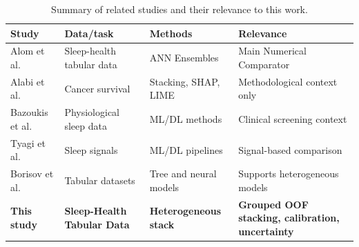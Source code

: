 \documentclass[a4paper,fleqn]{cas-dc}
\begin{document}
\begin{table}[width=\textwidth,pos=!tbp]

\centering

\caption{Summary of related studies and their relevance to this work.}

\label{tab:related_work}

\small

\setlength{\tabcolsep}{4pt}

\renewcommand{\arraystretch}{1.05}

\begin{tabularx}{\textwidth}{@{}Q{0.18\textwidth}Q{0.22\textwidth}Q{0.23\textwidth}Y@{}}

\toprule

Study & Data/task & Methods & Relevance \\

\midrule

Alom et al. \cite{alom2024} &

Sleep-health tabular data &

ANN Ensembles &

Main Numerical Comparator \\

Alabi et al. \cite{alabi2023} &

Cancer survival &

Stacking, SHAP, LIME &

Methodological context only \\

Bazoukis et al. \cite{bazoukis2023} &

Physiological sleep data &

ML/DL methods &

Clinical screening context \\

Tyagi et al. \cite{tyagi2023} &

Sleep signals &

ML/DL pipelines &

Signal-based comparison \\

Borisov et al. \cite{borisov2024} &

Tabular datasets &

Tree and neural models &

Supports heterogeneous models \\

\textbf{This study} &

\textbf{Sleep-Health Tabular Data} &

\textbf{Heterogeneous stack} &

\textbf{Grouped OOF stacking, calibration, uncertainty} \\

\bottomrule

\end{tabularx}

\end{table}
\end{document}
